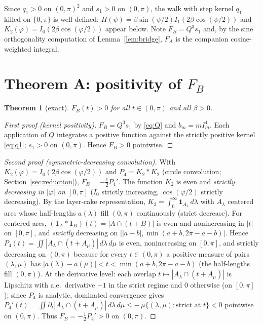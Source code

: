 \documentclass[11pt]{article}
\newtheorem{theorem}{Theorem}
\theoremstyle{remark}
\newcommand{\FA}{F_{\!A}}
\newcommand{\FB}{F_{\!B}}
\newcommand{\dd}{\,d}
\begin{document}
Since $q_1>0$ on $(0,\pi)^2$ and $s_1>0$ on $(0,\pi)$, the walk with step
kernel $q_1$ killed on $\{0,\pi\}$ is well defined; $H(\psi)=\beta
\sin(\psi/2)I_1(2\beta\cos(\psi/2))$ and $K_2(\varphi)=I_0(2\beta
\cos(\varphi/2))$ appear below. Note $\FB=Q^3s_1$ and, by the sine
orthogonality computation of Lemma~\ref{lem:bridge}, $\FA$ is the
companion cosine-weighted integral.

\section{Theorem A: positivity of $\FB$}\label{sec:thmA}

\begin{theorem}[exact]\label{thm:A}
$\FB(t)>0$ for all $t\in(0,\pi)$ and all $\beta>0$.
\end{theorem}

\begin{proof}[First proof (kernel positivity)]
$\FB=Q^3s_1$ by \eqref{eq:Q} and $b_m=mI_m^4$. Each application of $Q$
integrates a positive function against the strictly positive kernel
\eqref{eq:q1}; $s_1>0$ on $(0,\pi)$. Hence $\FB>0$ pointwise.
\end{proof}

\begin{proof}[Second proof (symmetric-decreasing convolution)]
With $K_2(\varphi)=I_0(2\beta\cos(\varphi/2))$ and $P_4=K_2*K_2$ (circle
convolution; Section~\ref{sec:reduction}), $\FB=-\tfrac12P_4'$. The
function $K_2$ is even and \emph{strictly decreasing in $|\varphi|$ on
$[0,\pi]$} ($I_0$ strictly increasing, $\cos(\varphi/2)$ strictly
decreasing). By the layer-cake representation, $K_2=\int_0^\infty
\mathbf 1_{A_\lambda}\dd\lambda$ with $A_\lambda$ centered arcs whose
half-lengths $a(\lambda)$ fill $(0,\pi)$ continuously (strict decrease).
For centered arcs, $(\mathbf 1_{A}*\mathbf 1_{B})(t)=|A\cap(t+B)|$ is
even and nonincreasing in $|t|$ on $[0,\pi]$, and \emph{strictly}
decreasing on $||a-b|,\min(a+b,2\pi-a-b)|$. Hence
$P_4(t)=\iint |A_\lambda\cap(t+A_\mu)|\dd\lambda\dd\mu$ is even,
nonincreasing on $[0,\pi]$, and strictly decreasing on $(0,\pi)$ because
for every $t\in(0,\pi)$ a positive measure of pairs $(\lambda,\mu)$ has
$|a(\lambda)-a(\mu)|<t<\min(a+b,2\pi-a-b)$ (the half-lengths fill
$(0,\pi)$). At the derivative level: each overlap $t\mapsto|A_\lambda\cap(t+A_\mu)|$
is Lipschitz with a.e.\ derivative $-1$ in the strict regime and $0$
otherwise (on $[0,\pi]$); since $P_4$ is analytic, dominated convergence
gives $P_4'(t)=\iint\partial_t|A_\lambda\cap(t+A_\mu)|\dd\lambda\dd\mu
\le-\,\mu\{(\lambda,\mu):\text{strict at }t\}<0$ pointwise on $(0,\pi)$.
Thus $\FB=-\tfrac12P_4'>0$ on $(0,\pi)$.
\end{proof}
\end{document}
